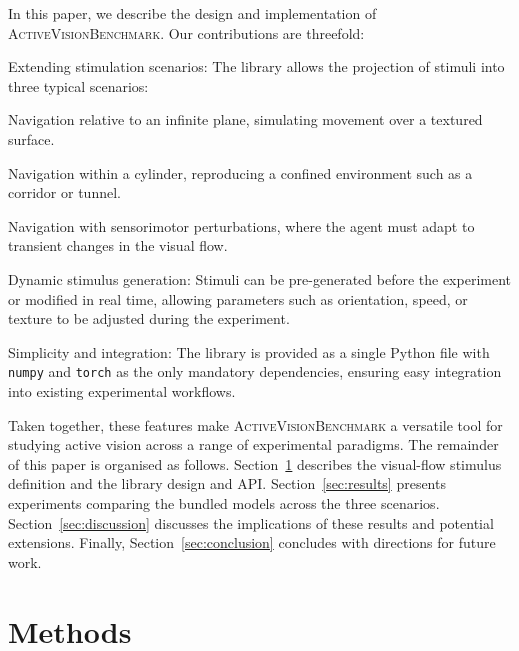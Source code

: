 \documentclass[12pt,a4paper]{article}
\newcommand{\avb}{\textsc{ActiveVisionBenchmark}}  %
\begin{document}
In this paper, we describe the design and implementation of \avb{}. Our contributions are threefold:

\begin{compactenum}
    \item Extending stimulation scenarios: The library allows the projection of stimuli into three typical scenarios:
    \begin{compactitem}
        \item Navigation relative to an infinite plane, simulating movement over a textured surface.
        \item Navigation within a cylinder, reproducing a confined environment such as a corridor or tunnel.
        \item Navigation with sensorimotor perturbations, where the agent must adapt to transient changes in the visual flow.
    \end{compactitem}

    \item Dynamic stimulus generation: Stimuli can be pre-generated before the experiment or modified in real time, allowing parameters such as orientation, speed, or texture to be adjusted during the experiment.

    \item Simplicity and integration: The library is provided as a single Python file with \texttt{numpy} and \texttt{torch} as the only mandatory dependencies, ensuring easy integration into existing experimental workflows.
\end{compactenum}

Taken together, these features make \avb{} a versatile tool for studying active vision across a range of experimental paradigms. The remainder of this paper is organised as follows. Section~\ref{sec:methods} describes the visual-flow stimulus definition and the library design and API. Section~\ref{sec:results} presents experiments comparing the bundled models across the three scenarios. Section~\ref{sec:discussion} discusses the implications of these results and potential extensions. Finally, Section~\ref{sec:conclusion} concludes with directions for future work.

\section{Methods}
\label{sec:methods}
\end{document}
